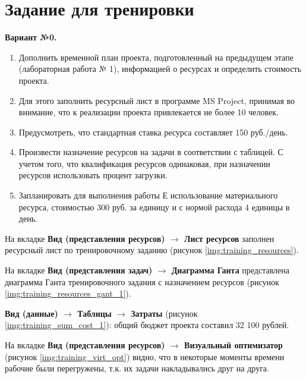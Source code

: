 \chapter{Задание для тренировки}

\textbf{Вариант №0.}

\begin{enumerate}
    \item Дополнить временной план проекта, подготовленный на предыдущем этапе
    (лабораторная работа № 1), информацией о ресурсах и определить стоимость 
    проекта.
    \item Для этого заполнить ресурсный лист в программе MS Project, принимая во
    внимание, что к реализации проекта привлекается не более 10 человек.
    \item Предусмотреть, что стандартная ставка ресурса составляет 150 руб./день.
    \item Произвести назначение ресурсов на задачи в соответствии с таблицей. С учетом 
    того, что квалификация ресурсов одинаковая, при назначении ресурсов 
    использовать процент загрузки.
    \item Запланировать для выполнения работы Е использование материального ресурса, 
    стоимостью 300 руб. за единицу и с нормой расхода 4 единицы в день.
\end{enumerate}

На вкладке \textbf{Вид (представления ресурсов) $ \rightarrow $ Лист ресурсов} заполнен ресурсный лист по тренировочному заданию (рисунок \ref{img:training_resources}).

На вкладке \textbf{Вид (представления задач) $ \rightarrow $ Диаграмма Ганта} представлена диаграмма Ганта тренировочного задания с назначением ресурсов (рисунок \ref{img:training_resources_gant_1}).

\textbf{Вид (данные) $ \rightarrow $ Таблицы $ \rightarrow $ Затраты} (рисунок \ref{img:training_sum_cost_1}): общий бюджет проекта составил 32 100 рублей.

На вкладке \textbf{Вид (представления ресурсов) $ \rightarrow $ Визуальный оптимизатор} (рисунок \ref{img:training_virt_opt}) видно, что в некоторые моменты времени рабочие были перегружены, т.к. их задачи накладывались друг на друга.
